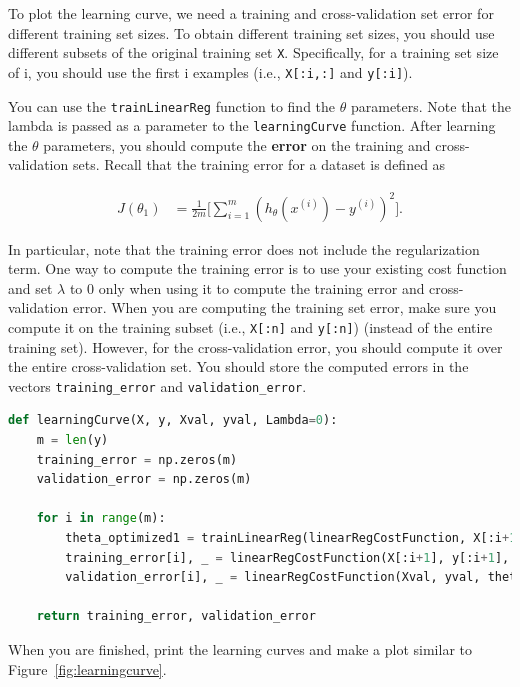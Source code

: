\documentclass[12pt]{article}
\begin{document}
To plot the learning curve, we need a training and cross-validation set error for different training set sizes. To obtain different training set sizes, you should use different subsets of the original training set \texttt{X}. Specifically, for a training set size of i, you should use the first i examples (i.e., \texttt{X[:i,:]} and \texttt{y[:i]}).

You can use the \texttt{trainLinearReg} function to find the $\theta$ parameters. Note that the lambda is passed as a parameter to the \texttt{learningCurve} function. After learning the $\theta$ parameters, you should compute the \textbf{error} on the training and cross-validation sets. Recall that the training error for a dataset is defined as

\begin{align}
  J(\theta_1) & = \frac{1}{2m}\bigg[\sum_{i=1}^m{(h_\theta(x^{(i)})-y^{(i)})^2}\bigg].
\end{align}

In particular, note that the training error does not include the regularization term. One way to compute the training error is to use your existing cost function and set $\lambda$ to 0 only when using it to compute the training error and cross-validation error. When you are computing the training set error, make sure you compute it on the training subset (i.e., \texttt{X[:n]} and \texttt{y[:n]}) (instead of the entire training set). However, for the cross-validation error, you should compute it over the entire cross-validation set. You should store the computed errors in the vectors \texttt{training\_error} and \texttt{validation\_error}.

\begin{lstlisting}[language=Python]
  def learningCurve(X, y, Xval, yval, Lambda=0):
    m = len(y)
    training_error = np.zeros(m)
    validation_error = np.zeros(m)

    for i in range(m):
        theta_optimized1 = trainLinearReg(linearRegCostFunction, X[:i+1], y[:i+1], Lambda)
        training_error[i], _ = linearRegCostFunction(X[:i+1], y[:i+1], theta_optimized1, Lambda)
        validation_error[i], _ = linearRegCostFunction(Xval, yval, theta_optimized1, Lambda)

    return training_error, validation_error
\end{lstlisting}

When you are finished, print the learning curves and make a plot similar to Figure~\ref{fig:learningcurve}.
\end{document}
